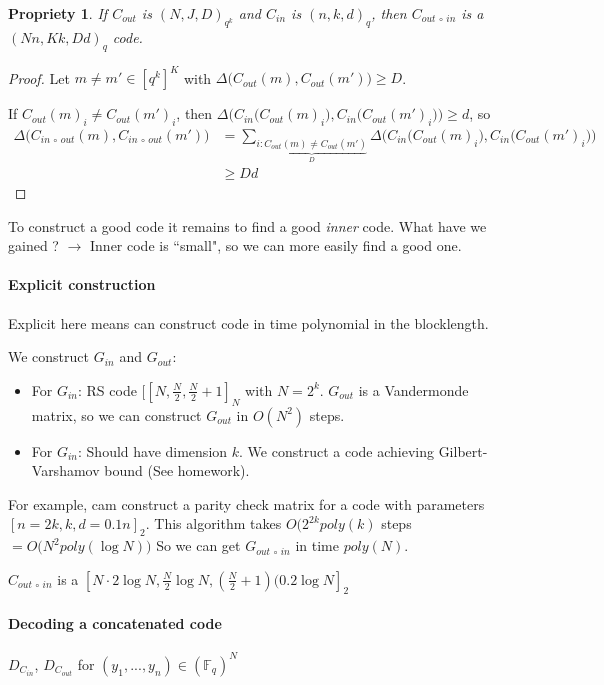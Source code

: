 \documentclass{article}
\newtheorem{prop}{Propriety}
\begin{document}
\begin{prop}
If $C_{out}$ is $(N,J,D)_{q^k}$ and $C_{in}$ is $(n,k,d)_q$, then $C_{out\,\circ\, in}$ is a $(Nn,Kk,Dd)_q$ code.
\end{prop}

\begin{proof}
Let $m\neq m'\in [q^k]^K$ with $\Delta \Big(C_{out}(m),C_{out}(m') \Big) \geq D$.

If $C_{out}(m)_i\neq C_{out}(m')_i$, then $\Delta\Big( C_{in} \big( C_{out}(m)_i\big),C_{in}\big( C_{out}(m')_i \big) \Big) \geq d$, so
\begin{align*}
\Delta \big( C_{in \,\circ \, out}(m),C_{in \,\circ \, out}(m')\big) & = \sum_{\underbrace{i:C_{out}(m)\neq C_{out}(m')}_{D}} \Delta\Big( C_{in} \big( C_{out}(m)_i\big),C_{in}\big( C_{out}(m')_i \big) \Big)\\
& \geq Dd
\end{align*}
\end{proof}

To construct a good code it remains to find a good \emph{inner} code. What have we gained ? $\to$ Inner code is ``small", so we can more easily find a good one.


\paragraph{Explicit construction}
Explicit here means can construct code in time polynomial in the blocklength.

We construct $G_{in}$ and $G_{out}$:
\begin{itemize}
\item For $G_{in}$: RS code $[\left[ N, \frac{N}{2}, \frac{N}{2}+1\right]_N$ with $N=2^k$. $G_{out}$ is a Vandermonde matrix, so we can construct $G_{out}$ in $O(N^2)$ steps.
\item For $G_{in}$: Should have dimension $k$. We construct a code achieving Gilbert-Varshamov bound (See homework).
\end{itemize}

For example, cam construct a parity check matrix for a code with parameters $[n=2k,k,d=0.1n]_2$. This algorithm takes $O(2^{2k} poly(k)$ steps $=O\big(N^2 poly(\log N) \big)$
So we can get $G_{out\,\circ \, in}$ in time $poly(N)$.

$C_{out \,\circ\, in}$ is a $\left[ N \cdot 2\log N,\frac{N}{2}\log N, \left( \frac{N}{2}+1 \right) (0.2 \log N\right]_2$

\paragraph{Decoding a concatenated code}
$D_{C_{in}}$, $D_{C_{out}}$ for $(y_1,...,y_n)\in (\mathbb{F}_q)^N$
\end{document}
